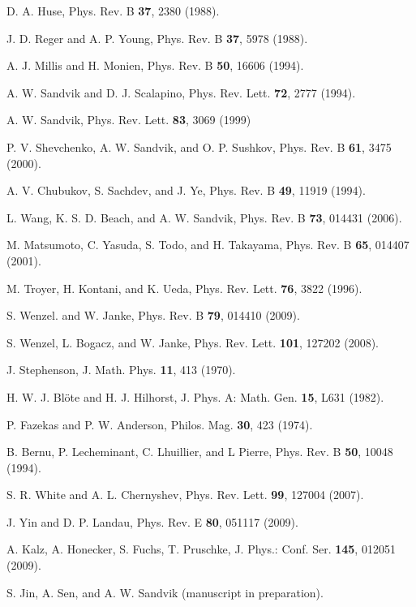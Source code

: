 \documentclass[draft,numberedheadings]{aipproc}
\begin{document}
\begin{thebibliography}{999}
D. A. Huse, Phys. Rev. B {\bf 37}, 2380 (1988).

J. D. Reger and A. P. Young, Phys. Rev. B {\bf 37}, 5978 (1988).

A. J. Millis and H. Monien, Phys. Rev. B {\bf 50}, 16606 (1994).

A. W. Sandvik and D. J. Scalapino, Phys. Rev. Lett. {\bf 72}, 2777 (1994).

A. W. Sandvik, Phys. Rev. Lett. {\bf 83}, 3069 (1999)

P. V. Shevchenko, A. W. Sandvik, and O. P. Sushkov, Phys. Rev. B {\bf 61}, 3475 (2000).

A. V. Chubukov, S. Sachdev, and J. Ye, Phys. Rev. B {\bf 49}, 11919 (1994).

L. Wang, K. S. D. Beach, and A. W. Sandvik, Phys. Rev. B {\bf 73}, 014431 (2006).

M. Matsumoto, C. Yasuda, S. Todo, and H. Takayama, Phys. Rev. B {\bf 65}, 014407 (2001).

M. Troyer, H. Kontani, and K. Ueda, Phys. Rev. Lett. {\bf 76}, 3822 (1996).

S. Wenzel. and W. Janke, Phys. Rev. B {\bf 79}, 014410 (2009).

S. Wenzel, L. Bogacz, and W. Janke, Phys. Rev. Lett. {\bf 101}, 127202 (2008).

J. Stephenson, J. Math. Phys. {\bf 11}, 413 (1970).

H. W. J. Bl\"ote and H. J. Hilhorst, J. Phys. A: Math. Gen. {\bf 15}, L631 (1982).

P. Fazekas and P. W. Anderson, Philos. Mag. {\bf 30}, 423 (1974).

B. Bernu, P. Lecheminant, C. Lhuillier, and L Pierre, Phys. Rev. B {\bf 50}, 10048 (1994).

S. R. White and A. L. Chernyshev, Phys. Rev. Lett. {\bf 99}, 127004 (2007).

J. Yin and D. P. Landau, Phys. Rev. E {\bf 80}, 051117 (2009).

A. Kalz, A. Honecker, S. Fuchs, T. Pruschke,
J. Phys.: Conf. Ser. {\bf 145}, 012051 (2009).

S. Jin, A. Sen, and A. W. Sandvik (manuscript in preparation).


\end{thebibliography}
\end{document}

